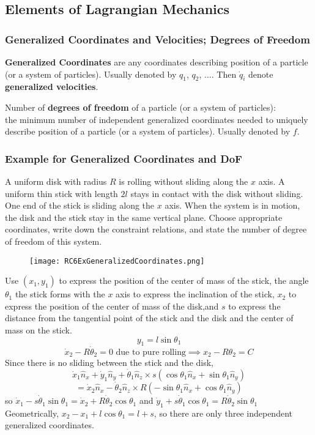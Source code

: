 \subsection{Elements of Lagrangian Mechanics}
\begin{frame}
\frametitle{Generalized Coordinates and Velocities; Degrees of Freedom}
\begin{definition}
\alert{\textbf{Generalized Coordinates}} are any coordinates describing \alert{position} of a particle (or a system of particles). Usually denoted by $q_1$, $q_2$, $\dots$. Then $\dot{q}_i$ denote \alert{\textbf{generalized velocities}}.
\end{definition}
\begin{definition}
Number of \alert{\textbf{degrees of freedom}} of a particle (or a system of particles):\\the minimum number of \alert{independent} generalized coordinates needed to \alert{uniquely} describe position of a particle (or a system of particles). Usually denoted by $f$.
\end{definition}
\end{frame}
\begin{frame}
\frametitle{Example for Generalized Coordinates and DoF}

A uniform disk with \alert{radius} $R$ is rolling without sliding along the $x$ axis. A uniform thin stick with \alert{length} $2l$ stays in contact with the disk without sliding. One end of the stick is sliding along the $x$ axis. When the system is in motion, the disk and the stick stay in the same vertical plane. Choose appropriate coordinates, write down the constraint relations, and state the number of degree of freedom of this system.
\begin{figure}[H]
\centering
\texttt{[image: RC6ExGeneralizedCoordinates.png]}
\end{figure}

\end{frame}
\begin{frame}
Use $(x_1,y_1)$ to express the position of the \alert{center of mass} of the stick, the angle $\theta_1$ the stick forms with the $x$ axis to express the inclination of the stick, $x_2$ to express the position of the \alert{center of mass} of the disk,and $s$ to express the distance from the tangential point of the stick and the disk and the center of mass on the stick.
\[y_1=l\sin\theta_1\]
\[\dot x_2-R\dot\theta_2=0\text{ due to pure rolling}\implies x_2-R\theta_2=C\]
Since there is no sliding between the stick and the disk,
\[\dot x_1 \hat n_x+\dot y_1\hat n_y+\dot\theta_1\hat n_z\times s(\cos\theta_1\hat n_x+\sin\theta_1\hat n_y)\]\[=\dot x_2\hat n_x-\dot\theta_2\hat n_z\times R(-\sin\theta_1\hat n_x+\cos\theta_1\hat n_y)\]
so $\dot x_1-s\dot\theta_1\sin\theta_1=\dot x_2+R\dot\theta_2\cos\theta_1$ and $\dot y_1+s\dot\theta_1\cos\theta_1=R\dot\theta_2\sin\theta_1$\\
Geometrically, $x_2-x_1+l\cos\theta_1=l+s$, so there are only three independent generalized coordinates.
\end{frame}

